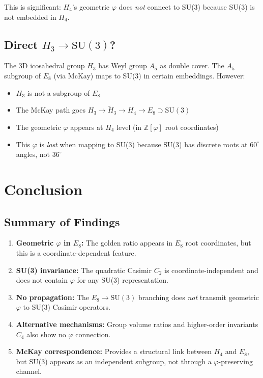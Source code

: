 \documentclass{article}
\begin{document}
\begin{table}[h]
This is significant: $H_4$'s geometric $\varphi$ does \emph{not} connect to SU(3) because SU(3) is not embedded in $H_4$.

\subsection{Direct $H_3 \to \text{SU}(3)$?}

The 3D icosahedral group $H_3$ has Weyl group $A_5$ as double cover. The $A_5$ subgroup of $E_8$ (via McKay) maps to SU(3) in certain embeddings. However:

\begin{itemize}
  \item $H_3$ is not a subgroup of $E_8$
  \item The McKay path goes $H_3 \to \tilde{H}_3 \to H_4 \to E_8 \supset \text{SU}(3)$
  \item The geometric $\varphi$ appears at $H_4$ level (in $\mathbb{Z}[\varphi]$ root coordinates)
  \item This $\varphi$ is \emph{lost} when mapping to SU(3) because SU(3) has discrete roots at $60^\circ$ angles, not $36^\circ$
\end{itemize}

\section{Conclusion}

\subsection{Summary of Findings}

\begin{enumerate}
  \item \textbf{Geometric $\varphi$ in $E_8$:} The golden ratio appears in $E_8$ root coordinates, but this is a coordinate-dependent feature.
  \item \textbf{SU(3) invariance:} The quadratic Casimir $C_2$ is coordinate-independent and does not contain $\varphi$ for any SU(3) representation.
  \item \textbf{No propagation:} The $E_8 \to \text{SU}(3)$ branching does \emph{not} transmit geometric $\varphi$ to SU(3) Casimir operators.
  \item \textbf{Alternative mechanisms:} Group volume ratios and higher-order invariants $C_4$ also show no $\varphi$ connection.
  \item \textbf{McKay correspondence:} Provides a structural link between $H_4$ and $E_8$, but SU(3) appears as an independent subgroup, not through a $\varphi$-preserving channel.
\end{enumerate}


\end{table}
\end{document}

